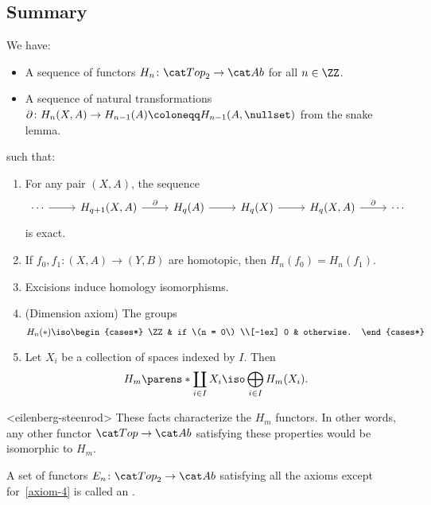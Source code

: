 \documentclass{standalone}
\begin{document}
\subsection{Summary}
We have:
\begin{itemize}[nosep]
  \item A sequence of functors \(H_n \colon \cTop_2 \to \cAb\)
  for all \(n \in \ZZ\).
  \item A sequence of natural transformations
  \(\partial \colon H_n(X, A) \to H_{n-1}(A) \coloneqq H_{n-1}(A, \nullset)\)
  from the snake lemma.
\end{itemize}
such that:
\begin{enumerate}[nosep]
  \item For any pair \((X, A)\), the sequence
  \[
    \begin{tikzcd}
    	\cdots \ar[r] &
    	H_{q+1}(X, A) \ar[r, "\partial"] &
    	H_q(A) \ar[r] &
    	H_q(X) \ar[r] &
    	H_q(X, A) \ar[r, "\partial"] &
    	\cdots
    \end{tikzcd}
  \]
  is exact.

  \item If \(f_0, f_1 \colon (X, A) \to (Y, B)\) are homotopic,
  then \(H_n(f_0) = H_n(f_1)\).

  \item Excisions induce homology isomorphisms.

  \item\label{axiom-4} (Dimension axiom) The groups
  \[
    H_n(*) \iso \begin{cases*}
      \ZZ & if \(n = 0\) \\[-1ex]
      0   & otherwise.
    \end{cases*}
  \]

  \item Let \(X_i\) be a collection of spaces
  indexed by \(I\). Then
  \[
    H_m\parens*{\coprod_{i \in I} X_i} \iso \bigoplus_{i \in I} H_m(X_i).
  \]
\end{enumerate}

\begin{theorem}<eilenberg-steenrod>
  These facts characterize the \(H_m\) functors.
  In other words, any other functor \(\cTop \to \cAb\)
  satisfying these properties would be isomorphic to \(H_m\).
\end{theorem}

\begin{remark}
   A set of functors \(E_n \colon \cTop_2 \to \cAb\) satisfying all the axioms
   except for~\ref{axiom-4} is called an .
\end{remark}
\end{document}
